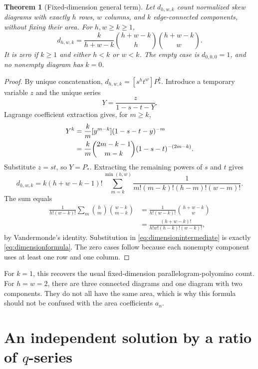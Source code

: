\documentclass[11pt,letterpaper]{article}
\numberwithin{equation}{section}
\newtheorem{theorem}{Theorem}[section]
\theoremstyle{definition}
\begin{document}
\begin{theorem}[Fixed-dimension general term]
\label{thm:dimensionformula}
Let $d_{h,w,k}$ count normalized skew diagrams with exactly $h$ rows, $w$
columns, and $k$ edge-connected components, without fixing their area. For
$h,w\ge k\ge1$,
\begin{equation}
 \boxed{\displaystyle
 d_{h,w,k}=\frac{k}{h+w-k}
 \binom{h+w-k}{h}\binom{h+w-k}{w}.}
 \label{eq:dimensionformula}
\end{equation}
It is zero if $k\ge1$ and either $h<k$ or $w<k$. The empty case is
$d_{0,0,0}=1$, and no nonempty diagram has $k=0$.
\end{theorem}
\begin{proof}
By unique concatenation, $d_{h,w,k}=[s^ht^w]P_*^k$. Introduce a temporary
variable $z$ and the unique series
\[
 Y=\frac{z}{1-s-t-Y}.
\]
Lagrange coefficient extraction gives, for $m\ge k$,
\begin{align}
 [z^m]Y^k
 &=\frac{k}{m}[y^{m-k}](1-s-t-y)^{-m}\notag\\
 &=\frac{k}{m}\binom{2m-k-1}{m-k}(1-s-t)^{-(2m-k)}.
 \label{eq:lagrange}
\end{align}
Substitute $z=st$, so $Y=P_*$. Extracting the remaining powers of $s$ and
$t$ gives
\begin{equation}
 d_{h,w,k}=k(h+w-k-1)!
 \sum_{m=k}^{\min(h,w)}
 \frac{1}{m!(m-k)!(h-m)!(w-m)!}.
 \label{eq:dimensionintermediate}
\end{equation}
The sum equals
\begin{align*}
 \frac{1}{h!(w-k)!}
 \sum_m\binom{h}{m}\binom{w-k}{m-k}
 &=\frac{1}{h!(w-k)!}\binom{h+w-k}{w}\\
 &=\frac{(h+w-k)!}{h!w!(h-k)!(w-k)!},
\end{align*}
by Vandermonde's identity. Substitution in
\eqref{eq:dimensionintermediate} is exactly
\eqref{eq:dimensionformula}. The zero cases follow because each nonempty
component uses at least one row and one column.
\end{proof}

For $k=1$, this recovers the usual fixed-dimension parallelogram-polyomino
count. For $h=w=2$, there are three connected diagrams and one diagram
with two components. They do not all have the same area, which is why this
formula should not be confused with the area coefficients $a_n$.

\section{An independent solution by a ratio of \texorpdfstring{$q$}{q}-series}
\label{sec:qseries}
\end{document}

